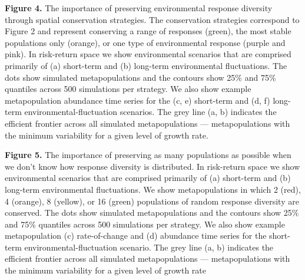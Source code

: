\documentclass[11pt]{article}
\begin{document}
\begin{spacing}{1.6}

\textbf{Figure 4.} The importance of preserving environmental response diversity through spatial conservation strategies. The conservation strategies correspond to Figure 2 and represent conserving a range of responses (green), the most stable populations only (orange), or one type of environmental response (purple and pink). In risk-return space we show environmental scenarios that are comprised primarily of (a) short-term and (b) long-term environmental fluctuations. The dots show simulated metapopulations and the contours show 25\% and 75\% quantiles across 500 simulations per strategy. We also show example metapopulation abundance time series for the (c, e) short-term and (d, f) long-term environmental-fluctuation scenarios. The grey line (a, b) indicates the efficient frontier across all simulated metapopulations --- metapopulations with the minimum variability for a given level of growth rate.


\textbf{Figure 5.} The importance of preserving as many populations as possible when we don't know how response diversity is distributed. In risk-return space we show environmental scenarios that are comprised primarily of (a) short-term and (b) long-term environmental fluctuations. We show metapopulations in which 2 (red), 4 (orange), 8 (yellow), or 16 (green) populations of random response diversity are conserved. The dots show simulated metapopulations and the contours show 25\% and 75\% quantiles across 500 simulations per strategy. We also show example metapopulation (c) rate-of-change and (d) abundance time series for the short-term environmental-fluctuation scenario. The grey line (a, b) indicates the efficient frontier across all simulated metapopulations --- metapopulations with the minimum variability for a given level of growth rate

\clearpage

\end{spacing}

\setlength{\parskip}{8pt}
\setlength{\parindent}{0cm}

\begin{spacing}{1.0}



\end{spacing}
\end{document}
